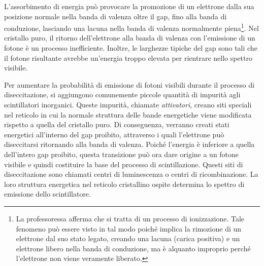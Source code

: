 L'assorbimento di energia può provocare la promozione di un elettrone dalla sua posizione normale nella banda di valenza oltre il gap, fino alla banda di conduzione, lasciando una lacuna nella banda di valenza normalmente piena\footnote{La professoressa afferma che si tratta di un processo di ionizzazione. Tale fenomeno può essere visto in tal modo poiché implica la rimozione di un elettrone dal suo stato legato, creando una lacuna (carica positiva) e un elettrone libero nella banda di conduzione, ma è alquanto improprio perché l'elettrone non viene veramente liberato.}. Nel cristallo puro, il ritorno dell'elettrone alla banda di valenza con l'emissione di un fotone è un processo inefficiente. Inoltre, le larghezze tipiche del gap sono tali che il fotone risultante avrebbe un'energia troppo elevata per rientrare nello spettro visibile.

Per aumentare la probabilità di emissione di fotoni visibili durante il processo di diseccitazione, si aggiungono comunemente piccole quantità di impurità agli scintillatori inorganici. Queste impurità, chiamate \textit{attivatori}, creano siti speciali nel reticolo in cui la normale struttura delle bande energetiche viene modificata rispetto a quella del cristallo puro. Di conseguenza, verranno creati stati energetici all'interno del gap proibito, attraverso i quali l'elettrone può diseccitarsi ritornando alla banda di valenza. Poiché l'energia è inferiore a quella dell'intero gap proibito, questa transizione può ora dare origine a un fotone visibile e quindi costituire la base del processo di scintillazione. Questi siti di diseccitazione sono chiamati centri di luminescenza o centri di ricombinazione. La loro struttura energetica nel reticolo cristallino ospite determina lo spettro di emissione dello scintillatore.

